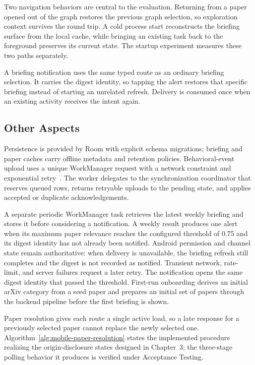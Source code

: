 Two navigation behaviors are central to the evaluation.
Returning from a paper opened out of the graph restores the previous graph
selection, so exploration context survives the round trip. A cold process
start reconstructs the briefing surface from the local cache, while bringing
an existing task back to the foreground preserves its current state. The
startup experiment measures these two paths separately.

A briefing notification uses the same typed route as an ordinary briefing
selection. It carries the digest identity, so tapping the alert restores that
specific briefing instead of starting an unrelated refresh. Delivery is
consumed once when an existing activity receives the intent again.

\subsection{Other Aspects}

Persistence is provided by Room with explicit schema migrations; briefing and paper caches carry offline metadata and retention policies.
Behavioral-event upload uses a unique WorkManager request with a network constraint and exponential retry~\cite{androidWorkManager2026}. The worker delegates to the synchronization coordinator that reserves queued rows, returns retryable uploads to the pending state, and applies accepted or duplicate acknowledgements.

A separate periodic WorkManager task retrieves the latest weekly briefing and
stores it before considering a notification. A weekly result produces one alert
when its maximum paper relevance reaches the configured threshold of 0.75 and
its digest identity has not already been notified. Android permission and
channel state remain authoritative: when delivery is unavailable, the briefing
refresh still completes and the digest is not recorded as notified. Transient
network, rate-limit, and server failures request a later retry. The notification
opens the same digest identity that passed the threshold.
First-run onboarding derives an initial arXiv category from a seed paper and prepares an initial set of papers through the backend pipeline before the first briefing is shown.

Paper resolution gives each route a single active load, so a late response for a previously selected paper cannot replace the newly selected one. Algorithm~\ref{alg:mobile-paper-resolution} states the implemented procedure realizing the origin-disclosure states designed in Chapter~3; the three-stage polling behavior it produces is verified under Acceptance Testing.

